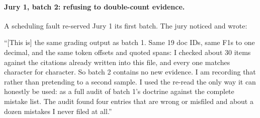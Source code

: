 \documentclass[11pt]{article}
\begin{document}
\paragraph{Jury 1, batch 2: refusing to double-count evidence.} A scheduling fault
re-served Jury 1 its first batch. The jury noticed and wrote:
\begin{tcolorbox}[colback=white, boxrule=0.4pt, left=3pt, right=3pt, top=3pt, bottom=3pt]
\scriptsize
``[This is] the same grading output as batch 1. Same 19 doc IDs, same F1s to one decimal,
and the same token offsets and quoted spans: I checked about 30 items against the
citations already written into this file, and every one matches character for character.
So batch 2 contains no new evidence. I am recording that rather than pretending to a
second sample. I used the re-read the only way it can honestly be used: as a full audit
of batch 1's doctrine against the complete mistake list. The audit found four entries
that are wrong or misfiled and about a dozen mistakes I never filed at all.''
\end{tcolorbox}
\end{document}
